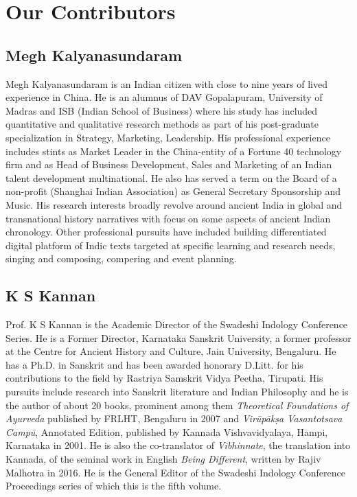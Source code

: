 
\chapter*{Our Contributors }\label{contributors}

\vskip 4pt

\section*{Megh Kalyanasundaram}

\vskip 4pt

Megh Kalyanasundaram is an Indian citizen with close to nine years of lived experience in China. He is an alumnus of DAV Gopalapuram, University of Madras and ISB (Indian School of Business) where his study has included quantitative and qualitative research methods as part of his post-graduate specialization in Strategy, Marketing, Leadership. His professional experience includes stints as Market Leader in the China-entity of a Fortune 40 technology firm and as Head of Business Development, Sales and Marketing of an Indian talent development multinational. He also has served a term on the Board of a non-profit (Shanghai Indian Association) as General Secretary Sponsorship and Music. His research interests broadly revolve around ancient India in global and transnational history narratives with focus on some aspects of ancient Indian chronology. Other professional pursuits have included building differentiated digital platform of Indic texts targeted at specific learning and research needs, singing and composing, compering and event planning.

\section*{K S Kannan}

Prof. K S Kannan is the Academic Director of the Swadeshi Indology Conference Series. He is a Former Director, Karnataka Sanskrit University, a former professor at the Centre for Ancient History and Culture, Jain University, Bengaluru. He has a Ph.D. in Sanskrit and has been awarded honorary D.Litt. for his contributions to the field by Rastriya Samskrit Vidya Peetha, Tirupati. His pursuits include research into Sanskrit literature and Indian Philosophy and he is the author of about 20 books, prominent among them \textit{Theoretical Foundations of Ayurveda} published by FRLHT, Bengaluru in 2007 and \textit{Virūpākṣa Vasantotsava Campū}, Annotated Edition, published by Kannada Vishvavidyalaya, Hampi, Karnataka in 2001. He is also the co-translator of \textit{Vibhinnate}, the translation into Kannada, of the seminal work in English \textit{Being Different}, written by Rajiv Malhotra in 2016. He is the General Editor of the Swadeshi Indology Conference Proceedings series of which this is the fifth volume.

